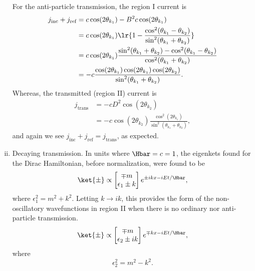 \begin{enumerate}[(i)]
For the anti-particle transmission, the region I current is
%
\begin{equation}\label{eqn:gradQuantumProblemSet4Problem3:1001}
\begin{aligned}
j_{\textrm{inc}}
+ j_{\textrm{ref}}
&=
c \cos( 2 \theta_{k_1} ) - B^2 c \cos( 2 \theta_{k_1} )
\\ &=
c \cos( 2 \theta_{k_1} )
\lr{ 1 -
\frac{ \cos^2(\theta_{k_1} - \theta_{k_2}) }{\sin^2(\theta_{k_1} + \theta_{k_2})} }
\\ &=
c \cos( 2 \theta_{k_1} )
\frac{ \sin^2(\theta_{k_1} + \theta_{k_2}) - \cos^2(\theta_{k_1} - \theta_{k_2}) }{\cos^2(\theta_{k_1} + \theta_{k_2})}
\\ &=
-c
\frac{ \cos( 2 \theta_{k_1} ) \cos(2 \theta_{k_1}) \cos(2 \theta_{k_2})}
{\sin^2(\theta_{k_1} + \theta_{k_2})}.
\end{aligned}
\end{equation}
%
Whereas, the transmitted (region II) current is
\begin{equation}\label{eqn:gradQuantumProblemSet4Problem3:1021}
\begin{aligned}
j_{\textrm{trans}}
&= -c D^2 \cos( 2 \theta_{k_2} )
\\ &= -c \cos( 2 \theta_{k_2} )
\frac{ \cos^2(2 \theta_{k_1}) }{\sin^2(\theta_{k_1} + \theta_{k_2})},
\end{aligned}
\end{equation}
%
and again we see \( j_{\textrm{inc}} + j_{\textrm{ref}} = j_{\textrm{trans}} \), as expected.
\item Decaying transmission.
In units where \( \Hbar = c = 1 \), the eigenkets found for the Dirac Hamiltonian, before normalization, were found to be
%
\begin{equation}\label{eqn:gradQuantumProblemSet4Problem3:1041}
\ket{\pm} \propto
\begin{bmatrix}
\mp m \\
\epsilon_1 \pm k
\end{bmatrix}
e^{\pm i k x - i E t/\Hbar},
\end{equation}
%
where \( \epsilon_1^2 = m^2 + k^2 \).  Letting \( k \rightarrow i k \), this provides the form of the non-oscillatory wavefunctions in region II when there is no ordinary nor anti-particle transmission.
%
\begin{equation}\label{eqn:gradQuantumProblemSet4Problem3:1061}
\ket{\pm} \propto
\begin{bmatrix}
\mp m \\
\epsilon_2 \pm i k
\end{bmatrix}
e^{\mp k x - i E t/\Hbar},
\end{equation}
%
where
%
\begin{equation}\label{eqn:gradQuantumProblemSet4Problem3:1081}
\epsilon_2^2 = m^2 - k^2.
\end{equation}


\end{enumerate}
